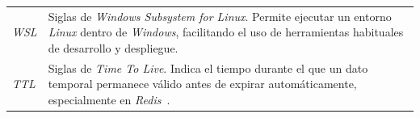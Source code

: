 {\begin{longtable}{p{3.2cm}p{9.2cm}}
\textit{WSL} & Siglas de \textit{Windows Subsystem for Linux}. Permite ejecutar un entorno \textit{Linux} dentro de \textit{Windows}, facilitando el uso de herramientas habituales de desarrollo y despliegue. \\
\textit{TTL} & Siglas de \textit{Time To Live}. Indica el tiempo durante el que un dato temporal permanece válido antes de expirar automáticamente, especialmente en \textit{Redis}~\cite{RedisDocs}. \\
\bottomrule
\end{longtable}
\vspace{0.45em}
}
